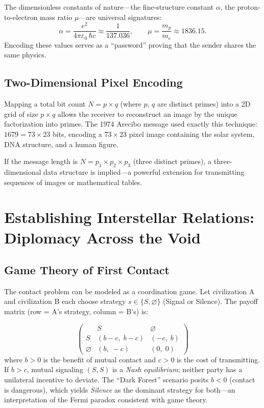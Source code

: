 \documentclass[12pt,a4paper]{article}
\begin{document}
The dimensionless constants of nature---the fine-structure constant
$\alpha$, the proton-to-electron mass ratio $\mu$---are universal signatures:
\begin{equation}
  \alpha = \frac{e^2}{4\pi\varepsilon_0\,\hbar c} \approx \frac{1}{137.036},
  \qquad
  \mu = \frac{m_p}{m_e} \approx 1836.15.
  \label{eq:constants}
\end{equation}
Encoding these values serves as a ``password'' proving that the sender
shares the same physics.

\subsection{Two-Dimensional Pixel Encoding}

Mapping a total bit count $N = p \times q$ (where $p$, $q$ are distinct primes)
into a 2D grid of size $p \times q$ allows the receiver to reconstruct an image
by the unique factorization into primes. The 1974 Arecibo message used exactly
this technique: $1679 = 73 \times 23$ bits, encoding a $73 \times 23$ pixel image
containing the solar system, DNA structure, and a human figure.

If the message length is $N = p_1 \times p_2 \times p_3$ (three distinct primes),
a three-dimensional data structure is implied---a powerful extension for
transmitting sequences of images or mathematical tables.

\section{Establishing Interstellar Relations: Diplomacy Across the Void}

\subsection{Game Theory of First Contact}

The contact problem can be modeled as a coordination game. Let civilization A
and civilization B each choose strategy $s \in \{S, \varnothing\}$ (Signal or
Silence). The payoff matrix (row = A's strategy, column = B's) is:

\begin{equation}
\begin{pmatrix}
  & S & \varnothing \\
  S & (b-c,\; b-c) & (-c,\; b) \\
  \varnothing & (b,\; -c) & (0,\; 0)
\end{pmatrix}
\label{eq:payoff}
\end{equation}
where $b > 0$ is the benefit of mutual contact and $c > 0$ is the cost of
transmitting. If $b > c$, mutual signaling $(S, S)$ is a \emph{Nash
equilibrium}; neither party has a unilateral incentive to deviate. The ``Dark
Forest'' scenario \citep{Liu2008} posits $b < 0$ (contact is dangerous),
which yields \emph{Silence} as the dominant strategy for both---an
interpretation of the Fermi paradox consistent with game theory.
\end{document}
